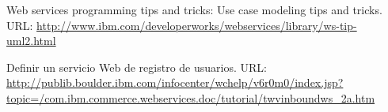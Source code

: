 \begin{thebibliography}{99}
  Web services programming tips and tricks: Use case modeling tips and tricks.\newline
    URL: \href{http://www.ibm.com/developerworks/webservices/library/ws-tip-uml2.html}
      {http://www.ibm.com/developerworks/webservices/library/ws-tip-uml2.html}

  Definir un servicio Web de registro de usuarios.\newline
    URL: \href{http://publib.boulder.ibm.com/infocenter/wchelp/v6r0m0/index.jsp?topic=/com.ibm.commerce.webservices.doc/tutorial/twvinboundws\_2a.htm}
      {http://publib.boulder.ibm.com/infocenter/wchelp/v6r0m0/index.jsp?\linebreak{}topic=/com.ibm.commerce.webservices.doc/tutorial/twvinboundws\_2a.htm}

\end{thebibliography}


